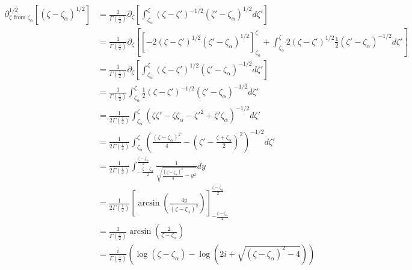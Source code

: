 \documentclass{article}
\begin{document}
\begin{align*}
\partial_{\zeta \text{ from } \zeta_\alpha}^{1/2}\left[(\zeta-\zeta_\alpha)^{1/2}\right]&=\frac{1}{\Gamma\left(\tfrac{1}{2}\right)}\partial_\zeta\left[\int_{\zeta_\alpha}^{\zeta}(\zeta-\zeta')^{-1/2}(\zeta'-\zeta_\alpha)^{1/2}d\zeta'\right]\\
&=\frac{1}{\Gamma\left(\tfrac{1}{2}\right)}\partial_{\zeta}\left[\left[-2(\zeta-\zeta')^{1/2}(\zeta'-\zeta_\alpha)^{1/2}\right]_{\zeta_\alpha}^{\zeta}+\int_{\zeta_\alpha}^{\zeta}2(\zeta-\zeta')^{1/2}\frac{1}{2}(\zeta'-\zeta_{\alpha})^{-1/2}d\zeta'\right]\\
&=\frac{1}{\Gamma\left(\tfrac{1}{2}\right)}\partial_{\zeta}\left[\int_{\zeta_\alpha}^{\zeta}(\zeta-\zeta')^{1/2}(\zeta'-\zeta_{\alpha})^{-1/2}d\zeta'\right]\\
&=\frac{1}{\Gamma\left(\tfrac{1}{2}\right)}\int_{\zeta_\alpha}^{\zeta}\frac{1}{2}(\zeta-\zeta')^{-1/2}(\zeta'-\zeta_\alpha)^{-1/2}d\zeta'\\
&=\frac{1}{2\Gamma\left(\tfrac{1}{2}\right)}\int_{\zeta_\alpha}^{\zeta}(\zeta\zeta'-\zeta\zeta_\alpha-\zeta'^2+\zeta'\zeta_\alpha)^{-1/2}d\zeta'\\
&=\frac{1}{2\Gamma\left(\tfrac{1}{2}\right)}\int_{\zeta_\alpha}^{\zeta}\left(\frac{(\zeta-\zeta_\alpha)^2}{4}-\left(\zeta'-\frac{\zeta+\zeta_\alpha}{2}\right)^2\right)^{-1/2}d\zeta'\\
&=\frac{1}{2\Gamma\left(\tfrac{1}{2}\right)}\int_{-\tfrac{\zeta-\zeta_{\alpha}}{2}}^{\tfrac{\zeta-\zeta_{\alpha}}{2}}\frac{1}{\sqrt{\tfrac{(\zeta-\zeta_{\alpha})^2}{4}-y^2}}dy\\
&=\frac{1}{2\Gamma\left(\tfrac{1}{2}\right)}\left[\arcsin\left(\tfrac{4y}{(\zeta-\zeta_{\alpha})^2}\right)\right]_{-\tfrac{\zeta-\zeta_{\alpha}}{2}}^{\tfrac{\zeta-\zeta_{\alpha}}{2}}\\
&=\frac{1}{\Gamma\left(\tfrac{1}{2}\right)}\arcsin\left(\tfrac{2}{\zeta-\zeta_\alpha}\right)\\
&=\frac{i}{\Gamma\left(\tfrac{1}{2}\right)}\left(\log(\zeta-\zeta_{\alpha})-\log(2i+\sqrt{(\zeta-\zeta_\alpha)^2-4})\right)
\end{align*}
\end{document}
